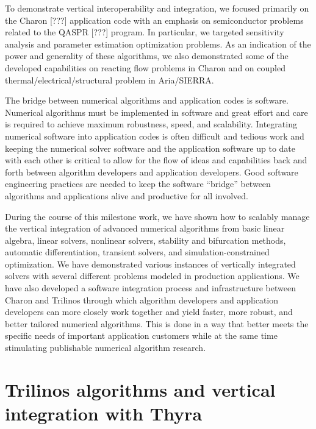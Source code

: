 \documentclass[pdf,ps2pdf,11pt]{SANDreport}
\begin{document}
To demonstrate vertical interoperability and integration, we focused primarily on
the Charon [???] application code with an emphasis on semiconductor problems
related to the QASPR [???] program.  In particular, we targeted sensitivity
analysis and parameter estimation optimization problems.  As an indication of
the power and generality of these algorithms, we also demonstrated some of the
developed capabilities on reacting flow problems in Charon and on coupled
thermal/electrical/structural problem in Aria/SIERRA.


The bridge between numerical algorithms and application codes is software.
Numerical algorithms must be implemented in software and great effort and care
is required to achieve maximum robustness, speed, and scalability.
Integrating numerical software into application codes is often difficult and
tedious work and keeping the numerical solver software and the application
software up to date with each other is critical to allow for the flow of ideas and
capabilities back and forth between algorithm developers and application
developers.  Good software engineering practices are needed to keep the
software ``bridge'' between algorithms and applications alive and productive
for all involved.

During the course of this milestone work, we have shown how to scalably manage
the vertical integration of advanced numerical algorithms from basic linear
algebra, linear solvers, nonlinear solvers, stability and bifurcation methods,
automatic differentiation, transient solvers, and simulation-constrained
optimization.  We have demonstrated various instances of vertically integrated
solvers with several different problems modeled in production applications.
We have also developed a software integration process and infrastructure
between Charon and Trilinos through which algorithm developers and application
developers can more closely work together and yield faster, more robust, and
better tailored numerical algorithms.  This is done in a way that better meets
the specific needs of important
application customers while at the same time stimulating publishable numerical
algorithm research.

%
\section{Trilinos algorithms and vertical integration with Thyra}
%
\end{document}
